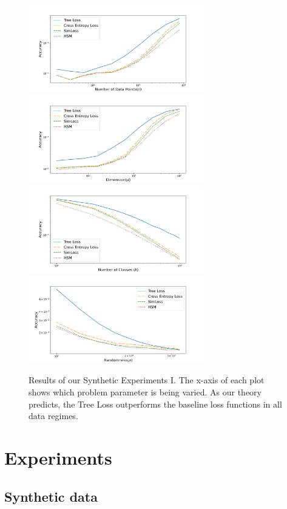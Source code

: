 \documentclass[twoside]{article}
\begin{document}
\begin{figure}
\includegraphics[width=\columnwidth,height=1.5in]{fig/ima/accuracy_vs_n.png}
\includegraphics[width=\columnwidth,height=1.5in]{fig/ima/accuracy_vs_d.png}
\includegraphics[width=\columnwidth,height=1.5in]{fig/ima/accuracy_vs_class.png}
\includegraphics[width=\columnwidth,height=1.5in]{fig/ima/accuracy_vs_sigma.png}
\caption{
    Results of our Synthetic Experiments I.
    The x-axis of each plot shows which problem parameter is being varied.
    As our theory predicts, the Tree Loss outperforms the baseline loss functions in all data regimes.
}
\label{fig:synth:1}
\end{figure}

\section{Experiments}
\label{sec:experiment}

\subsection{Synthetic data}
\end{document}
